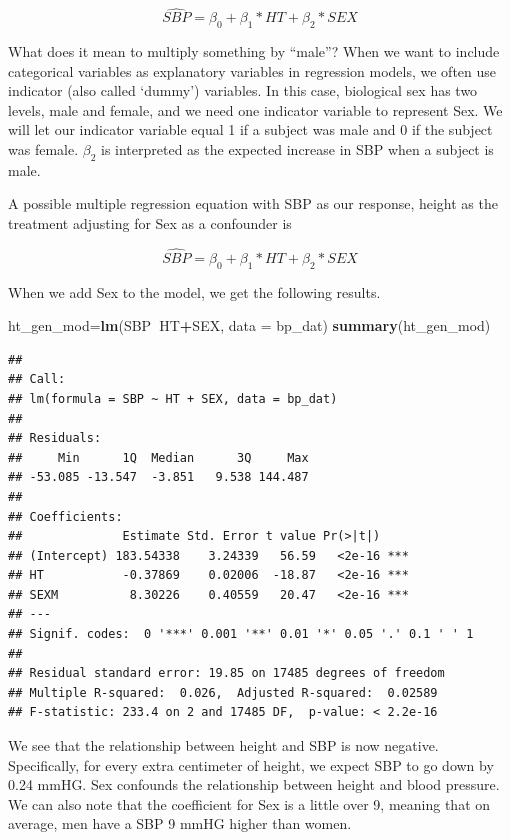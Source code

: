 \documentclass[]{book}
\newenvironment{Shaded}{\begin{snugshade}}{\end{snugshade}}
\newcommand{\DataTypeTok}[1]{\textcolor[rgb]{0.13,0.29,0.53}{#1}}
\newcommand{\KeywordTok}[1]{\textcolor[rgb]{0.13,0.29,0.53}{\textbf{#1}}}
\newcommand{\NormalTok}[1]{#1}
\newcommand{\OperatorTok}[1]{\textcolor[rgb]{0.81,0.36,0.00}{\textbf{#1}}}
\begin{document}
\[\widehat{SBP}=\beta_0+\beta_1*HT+\beta_2*SEX\]

What does it mean to multiply something by ``male''? When we want to include categorical variables as explanatory variables in regression models, we often use indicator (also called `dummy') variables. In this case, biological sex has two levels, male and female, and we need one indicator variable to represent Sex. We will let our indicator variable equal 1 if a subject was male and 0 if the subject was female. \(\beta_2\) is interpreted as the expected increase in SBP when a subject is male.

A possible multiple regression equation with SBP as our response, height as the treatment adjusting for Sex as a confounder is

\[\widehat{SBP}=\beta_0+\beta_1*HT+\beta_2*SEX\]

When we add Sex to the model, we get the following results.

\begin{Shaded}
\begin{Highlighting}[]
\NormalTok{ht_gen_mod=}\KeywordTok{lm}\NormalTok{(SBP}\OperatorTok{~}\NormalTok{HT}\OperatorTok{+}\NormalTok{SEX,}
         \DataTypeTok{data =}\NormalTok{ bp_dat)}
\KeywordTok{summary}\NormalTok{(ht_gen_mod)}
\end{Highlighting}
\end{Shaded}

\begin{verbatim}
## 
## Call:
## lm(formula = SBP ~ HT + SEX, data = bp_dat)
## 
## Residuals:
##     Min      1Q  Median      3Q     Max 
## -53.085 -13.547  -3.851   9.538 144.487 
## 
## Coefficients:
##              Estimate Std. Error t value Pr(>|t|)    
## (Intercept) 183.54338    3.24339   56.59   <2e-16 ***
## HT           -0.37869    0.02006  -18.87   <2e-16 ***
## SEXM          8.30226    0.40559   20.47   <2e-16 ***
## ---
## Signif. codes:  0 '***' 0.001 '**' 0.01 '*' 0.05 '.' 0.1 ' ' 1
## 
## Residual standard error: 19.85 on 17485 degrees of freedom
## Multiple R-squared:  0.026,  Adjusted R-squared:  0.02589 
## F-statistic: 233.4 on 2 and 17485 DF,  p-value: < 2.2e-16
\end{verbatim}

We see that the relationship between height and SBP is now negative. Specifically, for every extra centimeter of height, we expect SBP to go down by 0.24 mmHG. Sex confounds the relationship between height and blood pressure. We can also note that the coefficient for Sex is a little over 9, meaning that on average, men have a SBP 9 mmHG higher than women.
\end{document}
